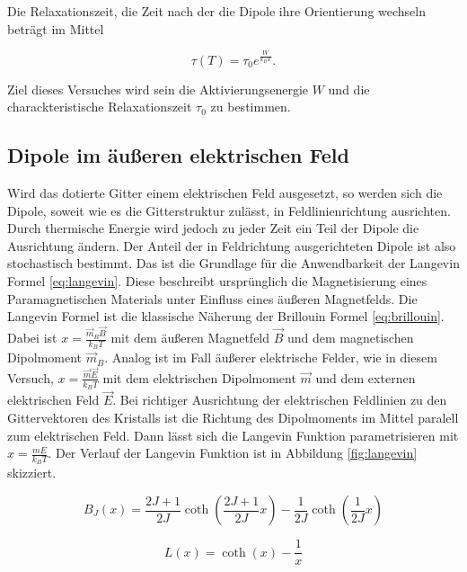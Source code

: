 Die Relaxationszeit, die Zeit nach der die Dipole ihre Orientierung wechseln beträgt im Mittel

\begin{equation}
  \label{eq:time}
  \tau(T) = \tau_0 e^{ \frac{W}{k_B T}}.
\end{equation}

Ziel dieses Versuches wird sein die Aktivierungsenergie $W$ und die charackteristische Relaxationszeit $\tau_0$ zu bestimmen.

\subsection{Dipole im äußeren elektrischen Feld }

Wird das dotierte Gitter einem elektrischen Feld ausgesetzt, so werden sich die Dipole, soweit wie es die Gitterstruktur zulässt, in Feldlinienrichtung
ausrichten. Durch thermische Energie wird jedoch zu jeder Zeit ein Teil der Dipole die Ausrichtung ändern. Der Anteil der in Feldrichtung
ausgerichteten Dipole ist also stochastisch bestimmt. Das ist die Grundlage für die Anwendbarkeit der Langevin Formel \ref{eq:langevin}.
Diese beschreibt ursprünglich die Magnetisierung eines Paramagnetischen Materials unter Einfluss eines äußeren Magnetfelds. Die Langevin Formel ist die klassische
Näherung der Brillouin Formel \ref{eq:brillouin}.
Dabei ist $x = \frac{\vec{m}_B \vec{B}}{k_B T}$ mit dem äußeren Magnetfeld $\vec{B}$ und dem magnetischen
Dipolmoment $\vec{m}_B$. Analog ist im Fall äußerer elektrische Felder, wie in diesem Versuch,   $x = \frac{\vec{m} \vec{E}}{k_B T}$ mit dem elektrischen Dipolmoment
$\vec{m}$ und dem externen elektrischen Feld $\vec{E}$. Bei richtiger Ausrichtung der elektrischen Feldlinien zu den Gittervektoren des Kristalls
ist die Richtung des Dipolmoments im Mittel paralell zum elektrischen Feld. Dann lässt sich die Langevin Funktion parametrisieren mit
$x= \frac{m E}{k_B T}$. Der Verlauf der Langevin Funktion ist in Abbildung \ref{fig:langevin} skizziert.

\begin{equation}
  \label{eq:brillouin}
  B_J(x) = \frac{2J + 1}{2J} \coth \left ( \frac{2J + 1}{2J} x \right ) - \frac{1}{2J} \coth \left ( \frac{1}{2J} x \right )
\end{equation}

\begin{equation}
  \label{eq:langevin}
  L(x) = \coth(x) - \frac{1}{x}
\end{equation}

